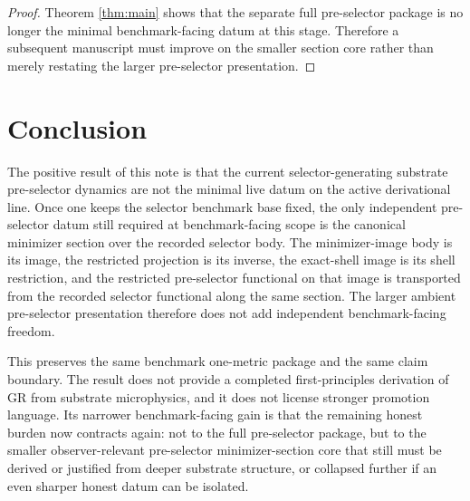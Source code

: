 \documentclass[11pt]{article}
\begin{document}
\begin{proof}
Theorem \ref{thm:main} shows that the separate full pre-selector package is no longer the minimal benchmark-facing datum at this stage. Therefore a subsequent manuscript must improve on the smaller section core rather than merely restating the larger pre-selector presentation.
\end{proof}

\section{Conclusion}

The positive result of this note is that the current selector-generating substrate pre-selector dynamics are not the minimal live datum on the active derivational line. Once one keeps the selector benchmark base fixed, the only independent pre-selector datum still required at benchmark-facing scope is the canonical minimizer section over the recorded selector body. The minimizer-image body is its image, the restricted projection is its inverse, the exact-shell image is its shell restriction, and the restricted pre-selector functional on that image is transported from the recorded selector functional along the same section. The larger ambient pre-selector presentation therefore does not add independent benchmark-facing freedom.

This preserves the same benchmark one-metric package and the same claim boundary. The result does not provide a completed first-principles derivation of GR from substrate microphysics, and it does not license stronger promotion language. Its narrower benchmark-facing gain is that the remaining honest burden now contracts again: not to the full pre-selector package, but to the smaller observer-relevant pre-selector minimizer-section core that still must be derived or justified from deeper substrate structure, or collapsed further if an even sharper honest datum can be isolated.
\end{document}

